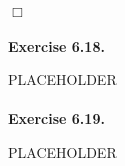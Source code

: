 \documentclass{article}
\begin{document}
$\Box$ \\\\






\textbf{Exercise 6.18.}

PLACEHOLDER \\\\






\textbf{Exercise 6.19.}

PLACEHOLDER \\\\



\end{document}
